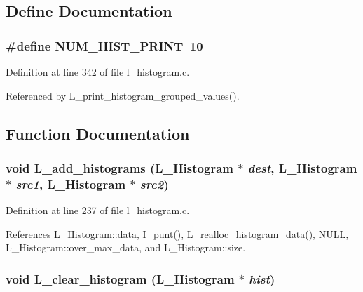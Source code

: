 \subsection{Define Documentation}
\subsubsection{\setlength{\rightskip}{0pt plus 5cm}\#define NUM\_\-HIST\_\-PRINT~10}\label{l__histogram_8c_af08d60e759fc9158114206e072ba860}




Definition at line 342 of file l\_\-histogram.c.

Referenced by L\_\-print\_\-histogram\_\-grouped\_\-values().

\subsection{Function Documentation}
\subsubsection{\setlength{\rightskip}{0pt plus 5cm}void L\_\-add\_\-histograms (\bf{L\_\-Histogram} $\ast$ {\em dest}, \bf{L\_\-Histogram} $\ast$ {\em src1}, \bf{L\_\-Histogram} $\ast$ {\em src2})}\label{l__histogram_8c_d7a785830793f8439039d15fc6b34306}




Definition at line 237 of file l\_\-histogram.c.

References L\_\-Histogram::data, I\_\-punt(), L\_\-realloc\_\-histogram\_\-data(), NULL, L\_\-Histogram::over\_\-max\_\-data, and L\_\-Histogram::size.
\subsubsection{\setlength{\rightskip}{0pt plus 5cm}void L\_\-clear\_\-histogram (\bf{L\_\-Histogram} $\ast$ {\em hist})}\label{l__histogram_8c_fda268df98c4256f508d178e93cae75e}




